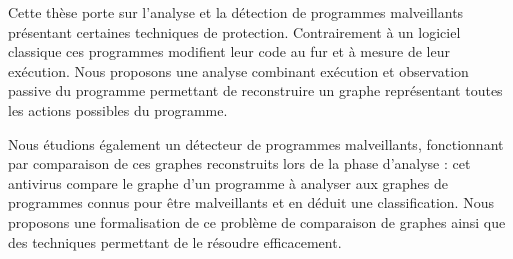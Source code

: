 Cette thèse porte sur l'analyse et la détection de programmes malveillants présentant certaines techniques de protection.
Contrairement à un logiciel classique ces programmes modifient leur code au fur et à mesure de leur exécution.
Nous proposons une analyse combinant exécution et observation passive du programme permettant de reconstruire un graphe représentant toutes les actions possibles du programme.

Nous étudions également un détecteur de programmes malveillants, fonctionnant par comparaison de ces graphes reconstruits lors de la phase d'analyse : cet antivirus compare le graphe d'un programme à analyser aux graphes de programmes connus pour être malveillants et en déduit une classification.
Nous proposons une formalisation de ce problème de comparaison de graphes ainsi que des techniques permettant de le résoudre efficacement.